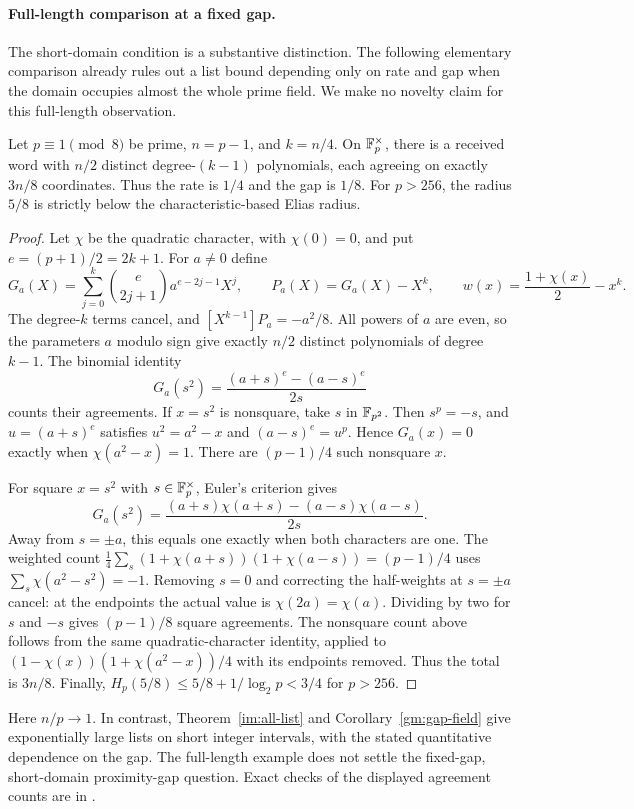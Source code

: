\paragraph{Full-length comparison at a fixed gap.}
The short-domain condition is a substantive distinction. The following
elementary comparison already rules out a list bound depending only on
rate and gap when the domain occupies almost the whole prime field.
We make no novelty claim for this full-length observation.

\begin{proposition}\label{prop:full-length-fixed-gap}
Let $p\equiv1\pmod8$ be prime, $n=p-1$, and $k=n/4$.
On $\mathbb F_p^\times$, there is a received word with $n/2$ distinct
degree-$(k-1)$ polynomials, each agreeing on exactly $3n/8$ coordinates.
Thus the rate is $1/4$ and the gap is $1/8$. For $p>256$, the radius
$5/8$ is strictly below the characteristic-based Elias radius.
\end{proposition}
\begin{proof}
Let $\chi$ be the quadratic character, with $\chi(0)=0$, and put
$e=(p+1)/2=2k+1$. For $a\ne0$ define
\[
 G_a(X)=\sum_{j=0}^k\binom e{2j+1}a^{e-2j-1}X^j,
 \qquad P_a(X)=G_a(X)-X^k,
 \qquad w(x)=\frac{1+\chi(x)}2-x^k.
\]
The degree-$k$ terms cancel, and
$[X^{k-1}]P_a=-a^2/8$. All powers of $a$ are even, so the parameters
$a$ modulo sign give exactly $n/2$ distinct polynomials of degree $k-1$.
The binomial identity
\[
 G_a(s^2)=\frac{(a+s)^e-(a-s)^e}{2s}
\]
counts their agreements. If $x=s^2$ is nonsquare, take $s$ in
$\mathbb F_{p^2}$. Then $s^p=-s$, and $u=(a+s)^e$ satisfies
$u^2=a^2-x$ and $(a-s)^e=u^p$. Hence $G_a(x)=0$ exactly when
$\chi(a^2-x)=1$. There are $(p-1)/4$ such nonsquare $x$.

For square $x=s^2$ with $s\in\mathbb F_p^\times$, Euler's criterion gives
\[
 G_a(s^2)=
 \frac{(a+s)\chi(a+s)-(a-s)\chi(a-s)}{2s}.
\]
Away from $s=\pm a$, this equals one exactly when both characters
are one. The weighted count
$\frac14\sum_s(1+\chi(a+s))(1+\chi(a-s))=(p-1)/4$
uses $\sum_s\chi(a^2-s^2)=-1$. Removing $s=0$ and correcting the
half-weights at $s=\pm a$ cancel: at the endpoints the actual value is
$\chi(2a)=\chi(a)$. Dividing by two for $s$ and $-s$ gives
$(p-1)/8$ square agreements. The nonsquare count above follows from
the same quadratic-character identity, applied to
$(1-\chi(x))(1+\chi(a^2-x))/4$ with its endpoints removed.
Thus the total is $3n/8$. Finally,
$H_p(5/8)\le5/8+1/\log_2p<3/4$ for $p>256$.
\end{proof}

Here $n/p\to1$. In contrast, Theorem~\ref{im:all-list} and
Corollary~\ref{gm:gap-field} give exponentially large lists on short
integer intervals, with the stated quantitative dependence on the gap.
The full-length example does not settle the fixed-gap, short-domain
proximity-gap question. Exact checks of the displayed agreement counts
are in .

